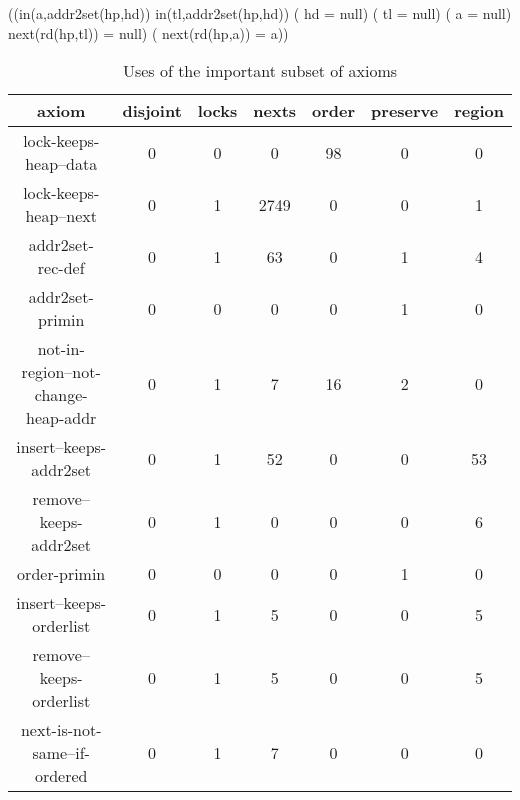 	\begin{axiomdescription}
		\label{ax::next_is_not_same__if_ordered}
		\begin{formula}
			\forall \ast \;\; ((in(a,addr2set(hp,hd)) \wedge in(tl,addr2set(hp,hd)) \wedge (\neg\;  hd = null) \wedge (\neg\;  tl = null) \wedge (\neg\;  a = null) \wedge next(rd(hp,tl)) = null) \implies (\neg\;  next(rd(hp,a)) = a))
		\end{formula}
	\end{axiomdescription}


\begin{table}
        \centering
        \begin{tabular}{c|cccccc}
        axiom & disjoint & locks & nexts & order & preserve & region 
        \\\hline
                lock-keeps-heap--data & 0 & 0 & 0 & 98 & 0 & 0 
                \\
                lock-keeps-heap--next & 0 & 1 & 2749 & 0 & 0 & 1 
                \\
                addr2set-rec-def & 0 & 1 & 63 & 0 & 1 & 4 
                \\
                addr2set-primin & 0 & 0 & 0 & 0 & 1 & 0 
                \\
                not-in-region--not-change-heap-addr & 0 & 1 & 7 & 16 & 2 & 0 
                \\
                insert--keeps-addr2set & 0 & 1 & 52 & 0 & 0 & 53 
                \\
                remove--keeps-addr2set & 0 & 1 & 0 & 0 & 0 & 6 
                \\
  	            order-primin & 0 & 0 & 0 & 0 & 1 & 0 
                \\
                insert--keeps-orderlist & 0 & 1 & 5 & 0 & 0 & 5
                \\
                remove--keeps-orderlist & 0 & 1 & 5 & 0 & 0 & 5 
                \\
                next-is-not-same--if-ordered & 0 & 1 & 7 & 0 & 0 & 0 
                \\
        \end{tabular}
\label{table:axiom_important}
\caption{Uses of the important subset of axioms}
\end{table}


